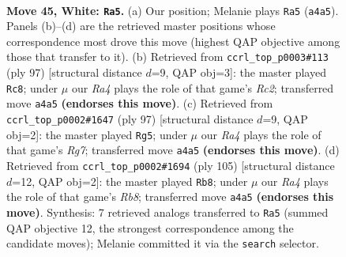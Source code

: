 \documentclass[11pt]{article}
\begin{document}
\clearpage

\begin{figure}[p]\centering
\begin{subfigure}{0.46\textwidth}\centering
\resizebox{\linewidth}{!}{%
\newchessgame
\chessboard[
  setfen={7k/7r/8/8/R7/P5K1/8/8 w - - 1 45},
  showmover=false,
  pgfstyle=straightmove, color=movearrow, markmove={a4-a5}
]}
\caption{}
\end{subfigure}\hfill
\begin{subfigure}{0.46\textwidth}\centering
\resizebox{\linewidth}{!}{%
\newchessgame
\chessboard[
  setfen={8/2r5/6pk/1P6/4R3/4K3/8/8 b - - 0 49},
  showmover=false,
  pgfstyle=straightmove, color=movearrow, markmove={c7-c8}
]}
\caption{}
\end{subfigure}
\\[4pt]
\begin{subfigure}{0.46\textwidth}\centering
\resizebox{\linewidth}{!}{%
\newchessgame
\chessboard[
  setfen={8/5k2/8/1P5p/3KR3/8/6r1/8 b - - 0 49},
  showmover=false,
  pgfstyle=straightmove, color=movearrow, markmove={g2-g5}
]}
\caption{}
\end{subfigure}\hfill
\begin{subfigure}{0.46\textwidth}\centering
\resizebox{\linewidth}{!}{%
\newchessgame
\chessboard[
  setfen={8/5k2/5p2/8/6R1/5P2/6K1/1r6 b - - 0 53},
  showmover=false,
  pgfstyle=straightmove, color=movearrow, markmove={b1-b8}
]}
\caption{}
\end{subfigure}
\caption{\textbf{Move 45, White: \texttt{Ra5}.} (a) Our position; Melanie plays \texttt{Ra5} (\texttt{a4a5}). Panels (b)--(d) are the retrieved master positions whose correspondence most drove this move (highest QAP objective among those that transfer to it). (b) Retrieved from \texttt{ccrl\_top\_p0003\#113} (ply 97) [structural distance $d$=9, QAP obj=3]: the master played \texttt{Rc8}; under $\mu$ our \emph{Ra4} plays the role of that game's \emph{Rc2}; transferred move \texttt{a4a5} \textbf{(endorses this move)}. (c) Retrieved from \texttt{ccrl\_top\_p0002\#1647} (ply 97) [structural distance $d$=9, QAP obj=2]: the master played \texttt{Rg5}; under $\mu$ our \emph{Ra4} plays the role of that game's \emph{Rg7}; transferred move \texttt{a4a5} \textbf{(endorses this move)}. (d) Retrieved from \texttt{ccrl\_top\_p0002\#1694} (ply 105) [structural distance $d$=12, QAP obj=2]: the master played \texttt{Rb8}; under $\mu$ our \emph{Ra4} plays the role of that game's \emph{Rb8}; transferred move \texttt{a4a5} \textbf{(endorses this move)}. Synthesis: 7 retrieved analogs transferred to \texttt{Ra5} (summed QAP objective 12, the strongest correspondence among the candidate moves); Melanie committed it via the \texttt{search} selector.}
\label{fig:thought-m88}
\end{figure}
\end{document}

